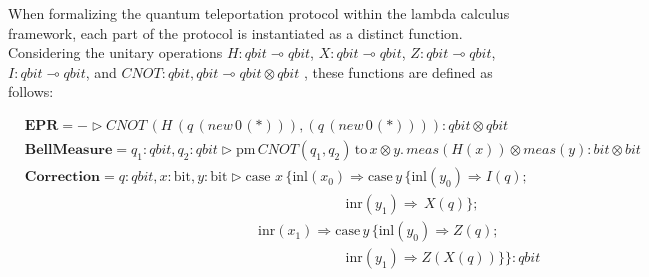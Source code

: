 \documentclass[10pt,a4paper]{amsart}
\theoremstyle{definition}
\theoremstyle{definition}
\theoremstyle{definition}
\theoremstyle{definition}
\theoremstyle{definition}
\theoremstyle{definition}
\begin{document}
When formalizing the quantum teleportation protocol within the lambda calculus framework, each part of the protocol is instantiated as a distinct function. 
Considering the unitary operations $H: \textit{qbit} \multimap  \textit{qbit}$, $X: \textit{qbit} \multimap  \textit{qbit}$, $Z: \textit{qbit} \multimap  \textit{qbit}$, $I: \textit{qbit} \multimap  \textit{qbit}$, and $\textit{CNOT}: \textit{qbit}, \textit{qbit} \multimap  \textit{qbit} \otimes \textit{qbit}$ , these functions are defined as follows:

\begin{align*}
   &\textbf{EPR} =  - \triangleright  \textit{CNOT} \hspace{2pt} (\textit{H}\hspace{2pt} (q  \hspace{2pt}    ( \textit{new}   \hspace{2pt}  0 \hspace{1pt}(*))),(q  \hspace{2pt}   ( \textit{new}   \hspace{2pt}  0 \hspace{1pt}(*)))) : \textit{qbit} \otimes \textit{qbit}  \\ 
      &\textbf{BellMeasure} =  q_{1}: \textit{qbit}, q_{2}: \textit{qbit}  \triangleright  \text{pm}  \hspace{2pt} \textit{CNOT} (q_{1},q_{2})  \hspace{2pt}  \text{to} \hspace{2pt} x \otimes y.  \hspace{2pt}  \textit{meas} (\textit{H} (x)) \otimes \textit{meas} (y) :  \textit{bit} \otimes \textit{bit} \\
      &\textbf{Correction}= q: \textit{qbit}, x: \text{bit},  y: \text{bit} \triangleright  \text{case } x  \hspace{2pt}  \{\text{inl} (x_{0}) \Rightarrow  \text{case}\hspace{2pt} y  \hspace{2pt}  \{\text{inl} (y_{0})  \Rightarrow{}  \textit{I}(q); \\
      & \hspace{275pt} \text{inr} (y_{1}) \Rightarrow  \hspace{2pt}   \textit{X} (q)\} ; \\
      & \hspace{200pt}\text{inr} (x_{1})  \Rightarrow  \text{case}\hspace{2pt} y  \hspace{2pt}  \{\text{inl} (y_{0})  \Rightarrow   \textit{Z}(q);  \\
      &\hspace{275pt} \text{inr} (y_{1}) \Rightarrow{} \textit{Z} (\textit{X}(q)) \}\} : \textit{qbit}
 \end{align*}
\end{document}
